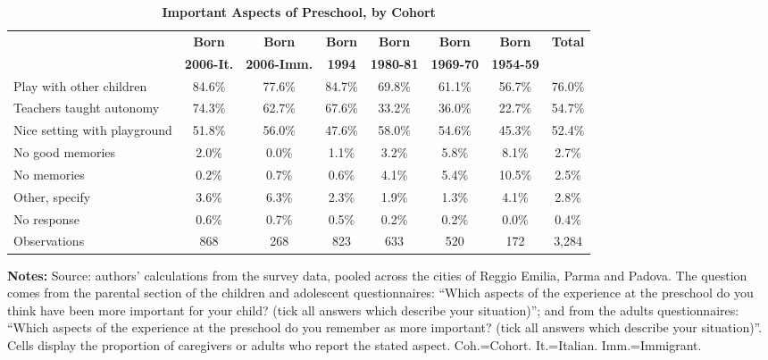 \begin{table}[ht!]
\footnotesize
\caption{\textbf{Important Aspects of Preschool, by Cohort}}
\label{tab:SumImportantMaterna}
\begin{center}
 \tiny 
 \begin{tabular}{ l c c c c c c c }
\hline \hline
& \textbf{Born} & \textbf{Born} & \textbf{Born} & \textbf{Born} & \textbf{Born} & \textbf{Born} & \textbf{Total} \\
& \textbf{2006-It.} & \textbf{2006-Imm.} & \textbf{1994} & \textbf{1980-81} & \textbf{1969-70} & \textbf{1954-59} & \textbf{} \\
\hline
Play with other children     & 84.6\% & 77.6\% & 84.7\% & 69.8\% & 61.1\% & 56.7\% & 76.0\%\\[0.2em]
Teachers taught autonomy     & 74.3\% & 62.7\% & 67.6\% & 33.2\% & 36.0\% & 22.7\% & 54.7\%\\[0.2em]
Nice setting with playground & 51.8\% & 56.0\% & 47.6\% & 58.0\% & 54.6\% & 45.3\% & 52.4\%\\[0.2em]
No good memories             &  2.0\% &  0.0\% &  1.1\% &  3.2\% &  5.8\% &  8.1\% &  2.7\%\\[0.2em]
No memories                  &  0.2\% &  0.7\% &  0.6\% &  4.1\% &  5.4\% & 10.5\% &  2.5\%\\[0.2em]
Other, specify               &  3.6\% &  6.3\% &  2.3\% &  1.9\% &  1.3\% &  4.1\% &  2.8\%\\[0.2em]
No response                  &  0.6\% &  0.7\% &  0.5\% &  0.2\% &  0.2\% &  0.0\% &  0.4\%\\
\hline
Observations                 &   868 &   268 &   823 &   633 &   520 &   172 &  3,284  \\
\hline
\end{tabular}
\end{center} \begin{flushleft}
\tiny{{\bfseries Notes:} Source: authors' calculations from the survey data, pooled across the cities of Reggio Emilia, Parma and Padova. The question comes from the parental section of the children and adolescent questionnaires: ``Which aspects of the experience at the preschool do you think have been more important for your child? (tick all answers which describe your situation)''; and from the adults questionnaires: ``Which aspects of the experience at the preschool do you remember as more important? (tick all answers which describe your situation)''. Cells display the proportion of caregivers or adults who report the stated aspect. Coh.=Cohort. It.=Italian. Imm.=Immigrant.}
\end{flushleft} \end{table}

